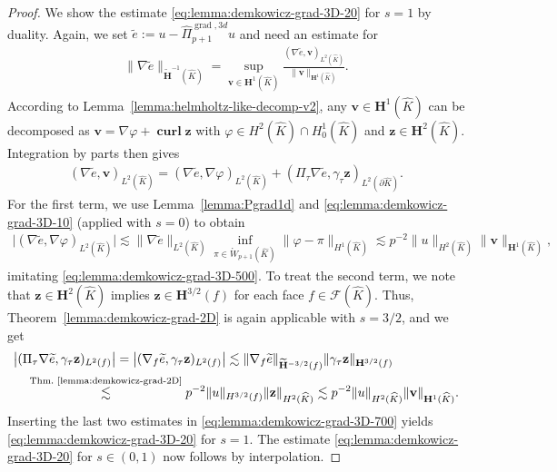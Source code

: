 \documentclass{article}
\newcommand{\hatPigradcom}{\widehat\Pi^{\operatorname*{grad},3d}_{p+1}}
\begin{document}
\begin{proof}
We show the estimate \eqref{eq:lemma:demkowicz-grad-3D-20} for $s=1$ by duality. 
Again, we set $\widetilde{e}:=u-\hatPigradcom u$ and need an estimate for
\begin{align}
\label{eq:lemma:demkowicz-grad-3D-700}
\|\nabla\widetilde{e}\|_{\widetilde{\mathbf{H}}^{-1}(\widehat{K})} = \operatorname*{sup}_{\mathbf{v}\in \mathbf{H}^1(\widehat{K})} \frac{(\nabla\widetilde{e},\mathbf{v})_{L^2(\widehat{K})}}{\|\mathbf{v}\|_{\mathbf{H}^1(\widehat{K})}}.
\end{align}
According to Lemma~\ref{lemma:helmholtz-like-decomp-v2}, any $\mathbf{v}\in \mathbf{H}^1(\widehat{K})$ can be decomposed as $\mathbf{v}=\nabla\varphi+\operatorname{\mathbf{curl}} \mathbf{z}$ 
with $\varphi\in H^2(\widehat{K}) \cap H^1_0(\widehat{K})$ and $\mathbf{z}\in \mathbf{H}^2(\widehat{K})$. Integration by parts then gives
\begin{align*}
(\nabla\widetilde{e},\mathbf{v})_{L^2(\widehat{K})} = (\nabla\widetilde{e},\nabla\varphi)_{L^2(\widehat{K})} + (\Pi_\tau \nabla\widetilde{e},\gamma_\tau \mathbf{z})_{L^2(\partial\widehat{K})}.
\end{align*}
For the first term, we use Lemma~\ref{lemma:Pgrad1d} and \eqref{eq:lemma:demkowicz-grad-3D-10} 
(applied with $s=0$) to obtain
\begin{align*}
\bigl| (\nabla\widetilde{e},\nabla\varphi)_{L^2(\widehat{K})}\bigr| \lesssim \|\nabla\widetilde{e}\|_{L^2(\widehat{K})} \operatorname*{inf}_{\pi\in \mathring{W}_{p+1}(\widehat{K})} \|\varphi-\pi\|_{H^1(\widehat{K})} \lesssim p^{-2} \|u\|_{H^2(\widehat{K})} \|\mathbf{v}\|_{\mathbf{H}^1(\widehat{K})},
\end{align*}
imitating \eqref{eq:lemma:demkowicz-grad-3D-500}. To treat the second term, we note that $\mathbf{z}\in \mathbf{H}^2(\widehat{K})$ implies $\mathbf{z}\in \mathbf{H}^{3/2}(f)$ for each face $f\in\mathcal{F}(\widehat{K})$. 
Thus, Theorem~\ref{lemma:demkowicz-grad-2D} is again applicable with $s=3/2$, and we get
\begin{align*}
&\bigl| (\Pi_\tau \nabla\widetilde{e},\gamma_\tau \mathbf{z})_{L^2(f)} \bigr| = 
\bigl| (\nabla_f\widetilde{e},\gamma_\tau \mathbf{z})_{L^2(f)} \bigr| \lesssim \|\nabla_f \widetilde{e}\|_{\widetilde{\mathbf{H}}^{-3/2}(f)} \|\gamma_\tau\mathbf{z}\|_{\mathbf{H}^{3/2}(f)} \\
&\quad \stackrel{\text{Thm.~\ref{lemma:demkowicz-grad-2D}}}{\lesssim} 
p^{-2} \|u\|_{H^{3/2}(f)} \|{\mathbf z}\|_{H^2(\widehat{K})} \lesssim p^{-2} \|u\|_{H^2(\widehat{K})} \|\mathbf{v}\|_{\mathbf{H}^1(\widehat{K})}.
\end{align*}
Inserting the last two estimates in \eqref{eq:lemma:demkowicz-grad-3D-700} yields \eqref{eq:lemma:demkowicz-grad-3D-20} for $s=1$. The estimate \eqref{eq:lemma:demkowicz-grad-3D-20} for $s\in (0,1)$ now follows by interpolation.
\end{proof}
\end{document}
